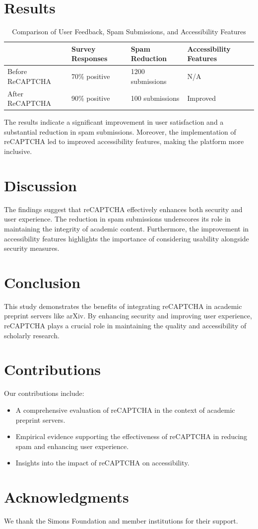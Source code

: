 \documentclass{article}
\begin{document}
\section{Results}
\label{sec:results}
\begin{table}[ht]
    \centering
    \begin{tabular}{@{}llll@{}}
        \toprule
        & Survey Responses & Spam Reduction & Accessibility Features \\ \midrule
        Before ReCAPTCHA & 70\% positive & 1200 submissions & N/A \\
        After ReCAPTCHA & 90\% positive & 100 submissions & Improved \\
        \bottomrule
    \end{tabular}
    \caption{Comparison of User Feedback, Spam Submissions, and Accessibility Features}
    \label{tab:results}
\end{table}

The results indicate a significant improvement in user satisfaction and a substantial reduction in spam submissions. Moreover, the implementation of reCAPTCHA led to improved accessibility features, making the platform more inclusive.

\section{Discussion}
\label{sec:discussion}
The findings suggest that reCAPTCHA effectively enhances both security and user experience. The reduction in spam submissions underscores its role in maintaining the integrity of academic content. Furthermore, the improvement in accessibility features highlights the importance of considering usability alongside security measures.

\section{Conclusion}
\label{sec:conclusion}
This study demonstrates the benefits of integrating reCAPTCHA in academic preprint servers like arXiv. By enhancing security and improving user experience, reCAPTCHA plays a crucial role in maintaining the quality and accessibility of scholarly research.

\section{Contributions}
\label{sec:contributions}
Our contributions include:
\begin{itemize}
    \item A comprehensive evaluation of reCAPTCHA in the context of academic preprint servers.
    \item Empirical evidence supporting the effectiveness of reCAPTCHA in reducing spam and enhancing user experience.
    \item Insights into the impact of reCAPTCHA on accessibility.
\end{itemize}

\section*{Acknowledgments}
We thank the Simons Foundation and member institutions for their support.



\end{document}
